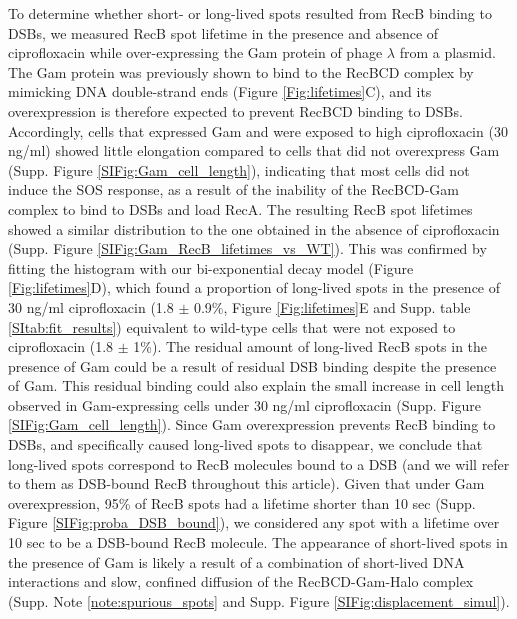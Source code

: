 To determine whether short- or long-lived spots resulted from RecB binding to DSBs, we measured RecB spot lifetime in the presence and absence of ciprofloxacin while over-expressing the Gam protein of phage $\lambda$ from a plasmid. The Gam protein was previously shown to bind to the RecBCD complex by mimicking DNA double-strand ends \cite{Wilkinson2016} (Figure \ref{Fig:lifetimes}C), and its overexpression is therefore expected to prevent RecBCD binding to DSBs. Accordingly, cells that expressed Gam and were exposed to high ciprofloxacin (30 ng/ml) showed little elongation compared to cells that did not overexpress Gam (Supp. Figure \ref{SIFig:Gam_cell_length}), indicating that most cells did not induce the SOS response, as a result of the inability of the RecBCD-Gam complex to bind to DSBs and load RecA. The resulting RecB spot lifetimes showed a similar distribution to the one obtained in the absence of ciprofloxacin (Supp. Figure \ref{SIFig:Gam_RecB_lifetimes_vs_WT}). This was confirmed by fitting the histogram with our bi-exponential decay model (Figure \ref{Fig:lifetimes}D), which found a proportion of long-lived spots in the presence of 30 ng/ml ciprofloxacin (1.8 $\pm$ 0.9\%, Figure \ref{Fig:lifetimes}E and Supp. table \ref{SItab:fit_results}) equivalent to wild-type cells that were not exposed to ciprofloxacin (1.8 $\pm$ 1\%). The residual amount of long-lived RecB spots in the presence of Gam could be a result of residual DSB binding despite the presence of Gam. This residual binding could also explain the small increase in cell length observed in Gam-expressing cells under 30 ng/ml ciprofloxacin (Supp. Figure \ref{SIFig:Gam_cell_length}). Since Gam overexpression prevents RecB binding to DSBs, and specifically caused long-lived spots to disappear, we conclude that long-lived spots correspond to RecB molecules bound to a DSB (and we will refer to them as DSB-bound RecB throughout this article). Given that under Gam overexpression, 95\% of RecB spots had a lifetime shorter than 10 sec (Supp. Figure \ref{SIFig:proba_DSB_bound}), we considered any spot with a lifetime over 10 sec to be a DSB-bound RecB molecule. The appearance of short-lived spots in the presence of Gam is likely a result of a combination of short-lived DNA interactions and slow, confined diffusion of the RecBCD-Gam-Halo complex (Supp. Note \ref{note:spurious_spots} and Supp. Figure \ref{SIFig:displacement_simul}).

